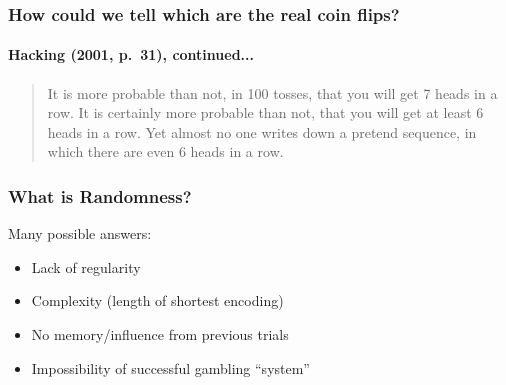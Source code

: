 \documentclass[handout]{beamer}
\begin{document}
\begin{frame}
\frametitle{How could we tell which are the real coin flips?}
\framesubtitle{Hacking (2001, p.\ 31), continued...}
\begin{quote}
It is more probable than not, in 100 tosses, that you will get 7 heads in a row. It is certainly more probable than not, that you will get at least 6 heads in a row. Yet almost no one writes down a pretend sequence, in which there are even 6 heads in a row.
\end{quote}

\end{frame}

\begin{frame}
\frametitle{What is Randomness?}
\pause
Many possible answers:
	\begin{itemize}
\item Lack of regularity
\item Complexity (length of shortest encoding)
\item No memory/influence from previous trials
\item Impossibility of successful gambling ``system''
\end{itemize}
\end{frame}
\end{document}

